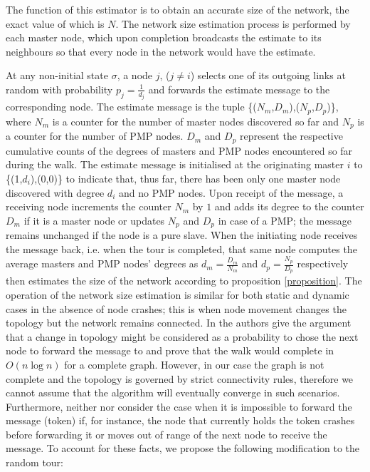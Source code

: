 \documentclass[twocolumn,10pt,conference]{IEEEtran}
\begin{document}
The function of this estimator is to obtain an accurate size of the network, the exact value of which is $N$. The network size estimation process is performed by each master node, which upon completion broadcasts the 
estimate to its neighbours so that every node in the network would have the estimate. 

At any non-initial state $\sigma$, a node $j$, 
($j\neq i$) selects one of its outgoing links at random with probability $p_j=\frac{1}{d_j}$ and forwards the estimate 
message to the corresponding node. The estimate message is the tuple \{($N_m$,$D_m$),($N_p$,$D_p$)\}, where $N_m$ 
is a counter for the number of master nodes discovered so far and $N_p$ is a counter for the number of PMP nodes. $D_m$ and 
$D_p$ represent the respective cumulative counts of the degrees of masters and PMP nodes encountered so far during 
the walk. The estimate message is initialised at the originating master $i$ to \{(1,$d_i$),(0,0)\} to indicate that, thus 
far, there has been only one master node discovered with degree $d_i$ and no PMP nodes. Upon receipt of the message, a receiving node increments the counter $N_m$ by $1$ and adds its degree to the counter $D_m$ if it is a master 
node or updates $N_p$ and $D_p$ in case of a PMP; the message remains unchanged if the node is a pure slave.
When   the   initiating   node   receives   the message back, i.e. when the tour is completed, that same node computes the average masters and PMP nodes' degrees as $d_m=\frac{D_m}{N_m}$ and $d_p=\frac{N_p}{D_p}$ respectively then 
estimates the size of the network according to proposition \ref{proposition}. The operation of the network size estimation is similar for 
both static and dynamic cases in the absence of node crashes; this is when node movement changes the topology but the 
network remains connected. In \cite{ref26} the authors give the argument that a change in topology might be considered as a 
probability to chose the next node to forward the message to and prove that the walk would complete in $O(n\log n)$ for a 
complete graph. However, in our case the graph is not complete and the topology is governed by strict connectivity rules, 
therefore we cannot assume that the algorithm will eventually converge in such scenarios. Furthermore, neither \cite{ref20} 
nor \cite{ref26} consider the case when it is impossible to forward the message (token) if, for instance, the 
node that currently holds the token crashes before forwarding it or moves out of range of the next node to receive the 
message. To account for these facts, we propose the following modification to the random tour:
\end{document}
